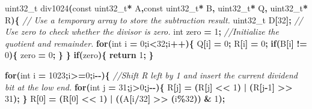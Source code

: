 \documentclass[11pt,a4paper]{ctexart}
\newenvironment{Shaded}{\begin{snugshade}}{\end{snugshade}}
\newcommand{\CommentTok}[1]{\textcolor[rgb]{0.56,0.35,0.01}{\textit{#1}}}
\newcommand{\ControlFlowTok}[1]{\textcolor[rgb]{0.13,0.29,0.53}{\textbf{#1}}}
\newcommand{\DataTypeTok}[1]{\textcolor[rgb]{0.13,0.29,0.53}{#1}}
\newcommand{\DecValTok}[1]{\textcolor[rgb]{0.00,0.00,0.81}{#1}}
\newcommand{\NormalTok}[1]{#1}
\newcommand{\OperatorTok}[1]{\textcolor[rgb]{0.81,0.36,0.00}{\textbf{#1}}}
\renewenvironment{Shaded}{\begin{snugshade}}{\end{snugshade}}
\begin{document}
\begin{Shaded}
\begin{Highlighting}[]
\DataTypeTok{uint32\_t}\NormalTok{ div1024}\OperatorTok{(}\DataTypeTok{const} \DataTypeTok{uint32\_t}\OperatorTok{*}\NormalTok{ A}\OperatorTok{,}\DataTypeTok{const} \DataTypeTok{uint32\_t}\OperatorTok{*}\NormalTok{ B}\OperatorTok{,} \DataTypeTok{uint32\_t}\OperatorTok{*}\NormalTok{ Q}\OperatorTok{,} \DataTypeTok{uint32\_t}\OperatorTok{*}\NormalTok{ R}\OperatorTok{)\{}
    \CommentTok{// Use a temporary array to store the subtraction result.}
    \DataTypeTok{uint32\_t}\NormalTok{ D}\OperatorTok{[}\DecValTok{32}\OperatorTok{];}
    \CommentTok{// Use zero to check whether the divisor is zero.}
    \DataTypeTok{int}\NormalTok{ zero }\OperatorTok{=} \DecValTok{1}\OperatorTok{;}
    \CommentTok{//Initialize the quotient and remainder.}
    \ControlFlowTok{for}\OperatorTok{(}\DataTypeTok{int}\NormalTok{ i }\OperatorTok{=} \DecValTok{0}\OperatorTok{;}\NormalTok{i}\OperatorTok{\textless{}}\DecValTok{32}\OperatorTok{;}\NormalTok{i}\OperatorTok{++)\{}
\NormalTok{        Q}\OperatorTok{[}\NormalTok{i}\OperatorTok{]} \OperatorTok{=} \DecValTok{0}\OperatorTok{;}
\NormalTok{        R}\OperatorTok{[}\NormalTok{i}\OperatorTok{]} \OperatorTok{=} \DecValTok{0}\OperatorTok{;}
        \ControlFlowTok{if}\OperatorTok{(}\NormalTok{B}\OperatorTok{[}\NormalTok{i}\OperatorTok{]} \OperatorTok{!=} \DecValTok{0}\OperatorTok{)\{}
\NormalTok{            zero }\OperatorTok{=} \DecValTok{0}\OperatorTok{;}
        \OperatorTok{\}}
    \OperatorTok{\}}
    \ControlFlowTok{if}\OperatorTok{(}\NormalTok{zero}\OperatorTok{)\{}
        \ControlFlowTok{return} \DecValTok{1}\OperatorTok{;}
    \OperatorTok{\}}

    \ControlFlowTok{for}\OperatorTok{(}\DataTypeTok{int}\NormalTok{ i }\OperatorTok{=} \DecValTok{1023}\OperatorTok{;}\NormalTok{i}\OperatorTok{\textgreater{}=}\DecValTok{0}\OperatorTok{;}\NormalTok{i}\OperatorTok{{-}{-})\{}
        \CommentTok{//Shift R left by 1 and insert the current dividend bit at the low end.}
        \ControlFlowTok{for}\OperatorTok{(}\DataTypeTok{int}\NormalTok{ j }\OperatorTok{=} \DecValTok{31}\OperatorTok{;}\NormalTok{j}\OperatorTok{\textgreater{}}\DecValTok{0}\OperatorTok{;}\NormalTok{j}\OperatorTok{{-}{-})\{}
\NormalTok{            R}\OperatorTok{[}\NormalTok{j}\OperatorTok{]} \OperatorTok{=} \OperatorTok{(}\NormalTok{R}\OperatorTok{[}\NormalTok{j}\OperatorTok{]} \OperatorTok{\textless{}\textless{}} \DecValTok{1}\OperatorTok{)} \OperatorTok{|} \OperatorTok{(}\NormalTok{R}\OperatorTok{[}\NormalTok{j}\OperatorTok{{-}}\DecValTok{1}\OperatorTok{]} \OperatorTok{\textgreater{}\textgreater{}} \DecValTok{31}\OperatorTok{);}
        \OperatorTok{\}}
\NormalTok{        R}\OperatorTok{[}\DecValTok{0}\OperatorTok{]} \OperatorTok{=} \OperatorTok{(}\NormalTok{R}\OperatorTok{[}\DecValTok{0}\OperatorTok{]} \OperatorTok{\textless{}\textless{}} \DecValTok{1}\OperatorTok{)} \OperatorTok{|} \OperatorTok{((}\NormalTok{A}\OperatorTok{[}\NormalTok{i}\OperatorTok{/}\DecValTok{32}\OperatorTok{]} \OperatorTok{\textgreater{}\textgreater{}} \OperatorTok{(}\NormalTok{i}\OperatorTok{\%}\DecValTok{32}\OperatorTok{))} \OperatorTok{\&} \DecValTok{1}\OperatorTok{);}


\end{Highlighting}
\end{Shaded}
\end{document}

